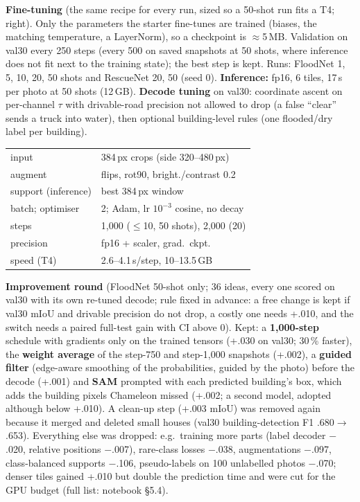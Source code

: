 \documentclass[10pt]{article}
\newcommand{\sect}[1]{\par\vspace{5pt}{\large\bfseries #1}\par\nobreak\vspace{1pt}\nobreak}
\begin{document}
\sect{4\quad Method and experimental setup}
\begin{minipage}[t]{0.50\textwidth}\vspace{0pt}
\textbf{Fine-tuning} (the same recipe for every run, sized so a 50-shot run fits a T4; right). Only the parameters the
starter fine-tunes are trained (biases, the matching temperature, a LayerNorm), so a checkpoint is $\approx$5\,MB.
Validation on val30 every 250 steps (every 500 on saved snapshots at 50 shots, where inference does not fit next to the
training state); the best step is kept. Runs: FloodNet 1, 5, 10, 20, 50 shots and RescueNet 20, 50 (seed 0).
\textbf{Inference:} fp16, 6 tiles, 17\,s per photo at 50 shots (12\,GB). \textbf{Decode tuning} on val30:
coordinate ascent on per-channel $\tau$ with drivable-road precision not allowed to drop (a false ``clear'' sends a
truck into water), then optional building-level rules (one flooded/dry label per building).
\end{minipage}\hfill
\begin{minipage}[t]{0.47\textwidth}\vspace{0pt}\small\setlength{\tabcolsep}{4pt}
\begin{tabular}{@{}ll@{}}\toprule
input & 384\,px crops (side 320--480\,px)\\
augment & flips, rot90, bright./contrast 0.2\\
support (inference) & best 384\,px window\\
batch; optimiser & 2; Adam, lr $10^{-3}$ cosine, no decay\\
steps & 1,000 ($\le$10, 50 shots), 2,000 (20)\\
precision & fp16 + scaler, grad.\ ckpt.\\
speed (T4) & 2.6--4.1\,s/step, 10--13.5\,GB\\\bottomrule
\end{tabular}
\end{minipage}
\vspace{3pt}

\textbf{Improvement round} (FloodNet 50-shot only; 36 ideas, every one scored on val30 with its own re-tuned decode;
rule fixed in advance: a free change is kept if val30 mIoU and drivable precision do not drop, a costly one needs
+.010, and the switch needs a paired full-test gain with CI above 0). Kept: a \textbf{1,000-step} schedule with
gradients only on the trained tensors (+.030 on val30; 30\,\% faster), the \textbf{weight average} of the step-750 and
step-1,000 snapshots (+.002), a \textbf{guided filter} (edge-aware smoothing of the probabilities, guided by the photo)
before the decode (+.001) and \textbf{SAM} prompted with each predicted building's box, which adds the building pixels
Chameleon missed (+.002; a second model, adopted although below +.010). A clean-up step (+.003 mIoU) was removed
again because it merged and deleted small houses (val30 building-detection F1 .680$\rightarrow$.653). Everything else
was dropped: e.g.\ training more parts (label decoder $-$.020, relative positions $-$.007), rare-class losses $-$.038,
augmentations $-$.097, class-balanced supports $-$.106, pseudo-labels on 100 unlabelled photos $-$.070; denser tiles
gained +.010 but double the prediction time and were cut for the GPU budget (full list: notebook \S5.4).
\end{document}
